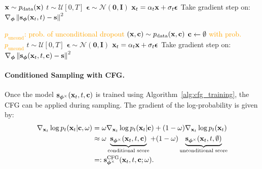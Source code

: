 \begin{center}
\begin{minipage}[t]{0.48\textwidth}
  \begin{algorithm}[H]
  {\small
    {\small \caption{Uncond. DM \label{alg:no_cfg_training} }}
    \begin{algorithmic}[1]
      \Repeat
        \State ${\mathbf{x}} \sim p_{\text{data}}({\mathbf{x}})$
        \State $t \sim \mathcal{U}[0, T]$
        \State $\bm{\epsilon} \sim \mathcal{N}(\mathbf{0}, \mathbf{I})$
        \State ${\mathbf{x}}_t = \alpha_t {\mathbf{x}} + \sigma_t \bm{\epsilon}$
        \State Take gradient step on:
        \Statex \quad $\nabla_{\bm{\phi}} \left\| {\mathbf{s}}_{\bm{\phi}}({\mathbf{x}}_t, t) - {\mathbf{s}} \right\|^2$
    \end{algorithmic}
    }
  \end{algorithm}
\end{minipage}
\hfill
\begin{minipage}[t]{0.48\textwidth}
  \begin{algorithm}[H]
      {\small
    {\small \caption{CFG for Cond. DM \label{alg:cfg_training}}}
    \begin{algorithmic}[1]
      \Require \textcolor{orange}{$p_\mathrm{uncond}$: prob. of unconditional dropout}
      \Repeat
        \State \textcolor{orange}{$({\mathbf{x}}, {\mathbf{c}}) \sim p_{\text{data}}({\mathbf{x}}, {\mathbf{c}})$}
        \State \textcolor{orange}{${\mathbf{c}} \gets \emptyset$ with prob. $p_\mathrm{uncond}$}
        \State $t \sim \mathcal{U}[0, T]$
        \State $\bm{\epsilon} \sim \mathcal{N}(\mathbf{0}, \mathbf{I})$
        \State ${\mathbf{x}}_t = \alpha_t {\mathbf{x}} + \sigma_t \bm{\epsilon}$
        \State Take gradient step on:
        \Statex \quad \textcolor{orange}{$\nabla_{\bm{\phi}} \left\| {\mathbf{s}}_{\bm{\phi}}({\mathbf{x}}_t, t, {\mathbf{c}}) - {\mathbf{s}} \right\|^2$}
    \end{algorithmic}
    }
  \end{algorithm}
\end{minipage}
\end{center}

\paragraph{Conditioned Sampling with CFG.}

Once the model ${\mathbf{s}}_{\bm{\phi}^\times}({\mathbf{x}}_t, t, {\mathbf{c}})$ is trained using Algorithm~\ref{alg:cfg_training}, the CFG can be applied during sampling. The gradient of the log-probability is given by:
\begin{align}\label{eq:cfg-model-nn}
\nabla_{{\mathbf{x}}_t} \log p_t({\mathbf{x}}_t | {\mathbf{c}}, \omega)
&= \omega \nabla_{{\mathbf{x}}_t} \log p_t({\mathbf{x}}_t | {\mathbf{c}}) + (1 - \omega) \nabla_{{\mathbf{x}}_t} \log p_t({\mathbf{x}}_t) \nonumber\\
&\approx \omega \underbrace{{\mathbf{s}}_{\bm{\phi}^\times}({\mathbf{x}}_t, t, {\mathbf{c}})}_{\text{conditional score}} + (1 - \omega) \underbrace{{\mathbf{s}}_{\bm{\phi}^\times}({\mathbf{x}}_t, t, \emptyset)}_{\text{unconditional score}}\\
&=: {\mathbf{s}}_{\bm{\phi}^\times}^{\text{CFG}}({\mathbf{x}}_t ,t, {\mathbf{c}}; \omega). \nonumber
\end{align}


